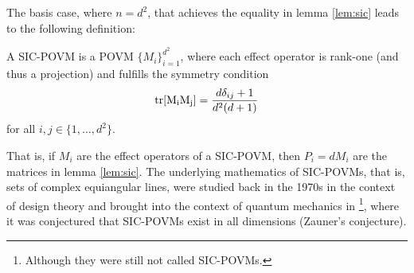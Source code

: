 The basis case, where $n=d^2$, that achieves the equality in lemma \ref{lem:sic} leads to the following definition:
\begin{definition}
A SIC-POVM is a POVM $\{M_i\}_{i=1}^{d^2}$, where each effect operator is rank-one (and thus a projection) and fulfills the symmetry condition 
\begin{align*}
    \mathrm{tr[M_i M_j]} = \frac{d \delta_{ij}+1}{d^2(d+1)}
\end{align*}
for all $i,j \in \{1,\dots, d^2\}$.
\end{definition}
That is, if $M_i$ are the effect operators of a SIC-POVM, then $P_i = dM_i$ are the matrices in lemma \ref{lem:sic}. 
The underlying mathematics of SIC-POVMs, that is, sets of complex equiangular lines, were studied back in the 1970s in the context of design theory \cite{Delsarte1975} and brought into the context of quantum mechanics in \cite{Zauner1999}\footnote{Although they were still not called SIC-POVMs.}, where it was conjectured that SIC-POVMs exist in all dimensions (Zauner's conjecture). 

